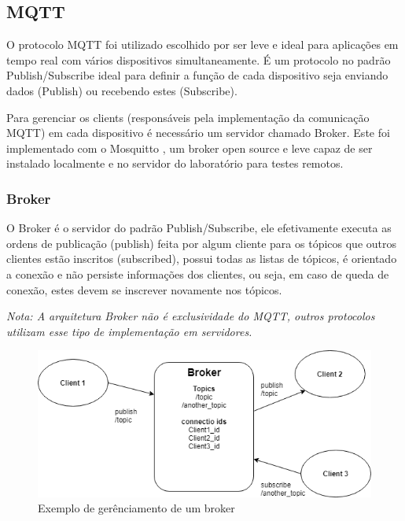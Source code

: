 \subsection{MQTT}
\label{subsection:mqtt}

O protocolo MQTT \cite{mqtt} foi utilizado escolhido por ser leve e ideal para aplicações em tempo real com vários dispositivos simultaneamente. É um protocolo no padrão Publish/Subscribe  ideal para definir a função de cada dispositivo seja enviando dados (Publish) ou recebendo estes (Subscribe).

Para gerenciar os clients (responsáveis pela implementação da comunicação MQTT) em cada dispositivo é necessário um servidor chamado Broker. Este foi implementado com o Mosquitto \cite{mosquitto}, um broker open source e leve capaz de ser instalado localmente e no servidor do laboratório para testes remotos.

\subsubsection{Broker}
\label{subsubsection:broker}

O Broker é o servidor do padrão Publish/Subscribe, ele efetivamente executa as ordens de publicação (publish) feita por algum cliente para os tópicos que outros clientes estão inscritos (subscribed), possui todas as listas de tópicos, é orientado a conexão e não persiste informações dos clientes, ou seja, em caso de queda de conexão, estes devem se inscrever novamente nos tópicos.

\textit{Nota: A arquitetura Broker não é exclusividade do MQTT, outros protocolos utilizam esse tipo de implementação em servidores.}


\begin{figure}[h]
\centering
\includegraphics[width=12cm]{./02_Capitulos/02_Cap3/figures/broker_pub_sub}
\caption{Exemplo de gerênciamento de um broker}
\label{fig:3.2.0/broker_pub_sub}
\end{figure}

